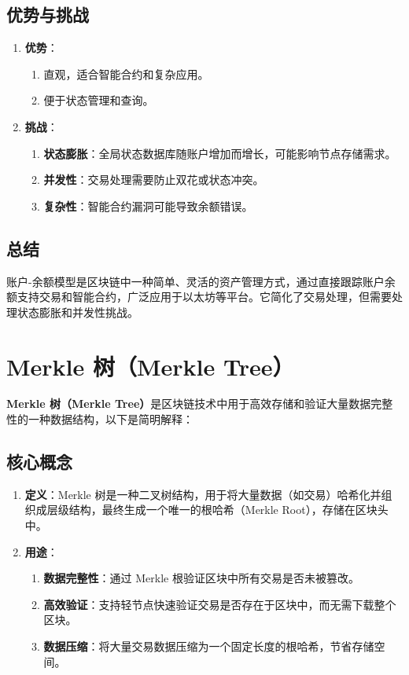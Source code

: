\documentclass[12pt]{ctexart}
\begin{document}
\subsection{优势与挑战}
\begin{enumerate}
    \item \textbf{优势}：
        \begin{enumerate}
            \item 直观，适合智能合约和复杂应用。
            \item 便于状态管理和查询。
        \end{enumerate}
    \item \textbf{挑战}：
        \begin{enumerate}
            \item \textbf{状态膨胀}：全局状态数据库随账户增加而增长，可能影响节点存储需求。
            \item \textbf{并发性}：交易处理需要防止双花或状态冲突。
            \item \textbf{复杂性}：智能合约漏洞可能导致余额错误。
        \end{enumerate}
\end{enumerate}

\subsection{总结}
账户-余额模型是区块链中一种简单、灵活的资产管理方式，通过直接跟踪账户余额支持交易和智能合约，广泛应用于以太坊等平台。它简化了交易处理，但需要处理状态膨胀和并发性挑战。

\newpage

\section{Merkle 树（Merkle Tree）}
\textbf{Merkle 树（Merkle Tree）}是区块链技术中用于高效存储和验证大量数据完整性的一种数据结构，以下是简明解释：

\subsection{核心概念}
\begin{enumerate}
    \item \textbf{定义}：Merkle 树是一种二叉树结构，用于将大量数据（如交易）哈希化并组织成层级结构，最终生成一个唯一的根哈希（Merkle Root），存储在区块头中。
    \item \textbf{用途}：
        \begin{enumerate}
            \item \textbf{数据完整性}：通过 Merkle 根验证区块中所有交易是否未被篡改。
            \item \textbf{高效验证}：支持轻节点快速验证交易是否存在于区块中，而无需下载整个区块。
            \item \textbf{数据压缩}：将大量交易数据压缩为一个固定长度的根哈希，节省存储空间。
        \end{enumerate}
\end{enumerate}
\end{document}
